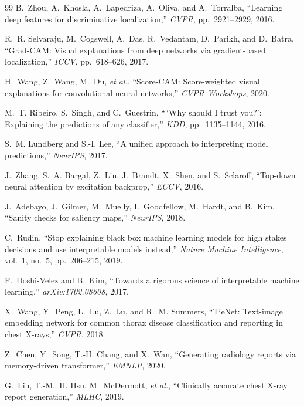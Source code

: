 \documentclass[conference]{IEEEtran}
\begin{document}
\begin{thebibliography}{99}
B.~Zhou, A.~Khosla, A.~Lapedriza, A.~Oliva, and A.~Torralba,
``Learning deep features for discriminative localization,'' \emph{CVPR},
pp.~2921--2929, 2016.

R.~R. Selvaraju, M.~Cogswell, A.~Das, R.~Vedantam, D.~Parikh, and D.~Batra,
``Grad-CAM: Visual explanations from deep networks via gradient-based
localization,'' \emph{ICCV}, pp.~618--626, 2017.

H.~Wang, Z.~Wang, M.~Du, \emph{et al.},
``Score-CAM: Score-weighted visual explanations for convolutional neural
networks,'' \emph{CVPR Workshops}, 2020.

M.~T. Ribeiro, S.~Singh, and C.~Guestrin,
``\,`Why should I trust you?': Explaining the predictions of any classifier,''
\emph{KDD}, pp.~1135--1144, 2016.

S.~M. Lundberg and S.-I. Lee,
``A unified approach to interpreting model predictions,'' \emph{NeurIPS}, 2017.

J.~Zhang, S.~A. Bargal, Z.~Lin, J.~Brandt, X.~Shen, and S.~Sclaroff,
``Top-down neural attention by excitation backprop,'' \emph{ECCV}, 2016.

J.~Adebayo, J.~Gilmer, M.~Muelly, I.~Goodfellow, M.~Hardt, and B.~Kim,
``Sanity checks for saliency maps,'' \emph{NeurIPS}, 2018.

C.~Rudin,
``Stop explaining black box machine learning models for high stakes decisions and
use interpretable models instead,'' \emph{Nature Machine Intelligence}, vol.~1,
no.~5, pp.~206--215, 2019.

F.~Doshi-Velez and B.~Kim,
``Towards a rigorous science of interpretable machine learning,''
\emph{arXiv:1702.08608}, 2017.

X.~Wang, Y.~Peng, L.~Lu, Z.~Lu, and R.~M. Summers,
``TieNet: Text-image embedding network for common thorax disease classification and
reporting in chest X-rays,'' \emph{CVPR}, 2018.

Z.~Chen, Y.~Song, T.-H. Chang, and X.~Wan,
``Generating radiology reports via memory-driven transformer,'' \emph{EMNLP}, 2020.

G.~Liu, T.-M.~H. Hsu, M.~McDermott, \emph{et al.},
``Clinically accurate chest X-ray report generation,'' \emph{MLHC}, 2019.


\end{thebibliography}
\end{document}
